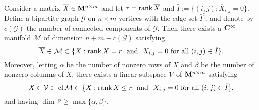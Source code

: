 \documentclass[smallextended,numbook]{svjour3}
\begin{document}
\begin{lem}\label{lem:sparse_rank}\hfill \\
Consider a matrix $\overline{X}\in{\bf M}^{n\times m}$ and let $r={\mbox{\rm rank}\,} \overline{X}$ and $\bar{I}:=\{(i,j):\overline{X}_{i,j}=0\}$. Define a bipartite graph $\mathcal{G}$ on $n\times m$ vertices with the edge set $\bar{I}^c$, and denote by $c(\mathcal{G})$ the number of connected components of $\mathcal{G}$. Then there exists a ${\bf C}^{\infty}$ manifold $\mathcal{M}$ of dimension $n+m-c(\mathcal{G})$ satisfying
\begin{equation}\label{eqn:inclusion_man}
\overline{X}\in\mathcal{M}\subset \{X: {\mbox{\rm rank}\,} X = r ~\textrm{ and }~ X_{i,j}=0 \textrm{ for all } (i,j)\in \bar{I}\}.
\end{equation}
Moreover, letting $\alpha$ be the number of nonzero rows of $\overline{X}$ and $\beta$ be the number of nonzero columns of $\overline{X}$, there exists a linear subspace $ \mathcal{V}$ of  ${\bf M}^{n\times m}$ satisfying  
\begin{equation}\label{eqn:inclusion}
\overline{X}\in\mathcal{V}\subset {\mbox{\rm cl}\,} \mathcal{M} \subset \{X: {\mbox{\rm rank}\,} X \leq r ~\textrm{ and }~ X_{i,j}=0 \textrm{ for all } (i,j)\in \bar{I}\},
\end{equation}
and having $\dim\mathcal{V}\geq \max\{\alpha,\beta\}$.
\end{lem}
\end{document}
